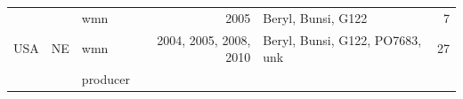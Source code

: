 \documentclass[fleqn,10pt,lineno]{wlpeerj} %
\theoremstyle{definition}
\theoremstyle{definition}
\theoremstyle{definition}
\theoremstyle{remark}
\begin{document}
\begin{longtable}[]{@{}lllrlr@{}}
\begin{minipage}[t]{0.11\columnwidth}\raggedright\strut
\strut
\end{minipage} & \begin{minipage}[t]{0.08\columnwidth}\raggedright\strut
\strut
\end{minipage} & \begin{minipage}[t]{0.12\columnwidth}\raggedright\strut
wmn\strut
\end{minipage} & \begin{minipage}[t]{0.19\columnwidth}\raggedleft\strut
2005\strut
\end{minipage} & \begin{minipage}[t]{0.29\columnwidth}\raggedright\strut
Beryl, Bunsi, G122\strut
\end{minipage} & \begin{minipage}[t]{0.04\columnwidth}\raggedleft\strut
7\strut
\end{minipage}\tabularnewline
\begin{minipage}[t]{0.11\columnwidth}\raggedright\strut
USA\strut
\end{minipage} & \begin{minipage}[t]{0.08\columnwidth}\raggedright\strut
NE\strut
\end{minipage} & \begin{minipage}[t]{0.12\columnwidth}\raggedright\strut
wmn\strut
\end{minipage} & \begin{minipage}[t]{0.19\columnwidth}\raggedleft\strut
2004, 2005, 2008, 2010\strut
\end{minipage} & \begin{minipage}[t]{0.29\columnwidth}\raggedright\strut
Beryl, Bunsi, G122, PO7683, unk\strut
\end{minipage} & \begin{minipage}[t]{0.04\columnwidth}\raggedleft\strut
27\strut
\end{minipage}\tabularnewline
\begin{minipage}[t]{0.11\columnwidth}\raggedright\strut
\strut
\end{minipage} & \begin{minipage}[t]{0.08\columnwidth}\raggedright\strut
\strut
\end{minipage} & \begin{minipage}[t]{0.12\columnwidth}\raggedright\strut
producer\strut
\end{minipage} & \begin{minipage}[t]{0.19\columnwidth}\raggedleft\strut

\end{minipage}
\end{longtable}
\end{document}
